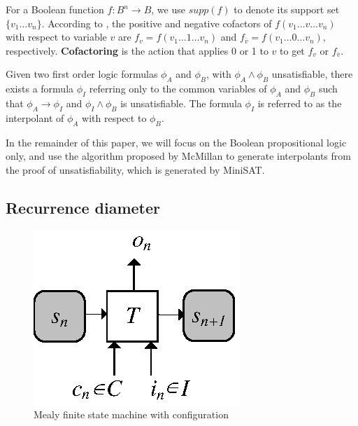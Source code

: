 \documentclass{acm_proc_article-sp}
\begin{document}

For a Boolean function $f:B^n\to B$,
we use $supp(f)$ to denote its support set $\{v_1\dots v_n\}$.
According to \cite{Cofact},
the positive and negative cofactors of $f(v_1\dots v\dots v_n)$ with respect to variable
$v$ are $f_v=f(v_1\dots 1\dots v_n)$ and $f_{\overline{v}}=f(v_1\dots 0\dots v_n)$,
respectively.
\textbf{Cofactoring} is the action that applies 0 or 1 to $v$ to get $f_v$ or $f_{\overline{v}}$.


\begin{theorem}\label{thm_craig}
Given two first order logic formulas $\phi_A$ and $\phi_B$,
with $\phi_A\wedge \phi_B$ unsatisfiable,
there exists a formula $\phi_I$ referring only
to the common variables of $\phi_A$ and $\phi_B$ such that $\phi_A\to \phi_I$
and $\phi_I\wedge \phi_B$ is unsatisfiable.
The formula $\phi_I$ is referred to as the interpolant of $\phi_A$ with respect to $\phi_B$.
\end{theorem}
In the remainder of this paper,
we will focus on the Boolean propositional logic only,
and use the algorithm proposed by McMillan\cite{interp_McMillan} to generate interpolants from the proof of unsatisfiability,
which is generated by MiniSAT\cite{EXTSAT}.

\subsection{Recurrence diameter}

\begin{figure}[t]
\centering
\includegraphics{mealy}
\caption{Mealy finite state machine with configuration}
\label{mealy}
\end{figure}
\end{document}
